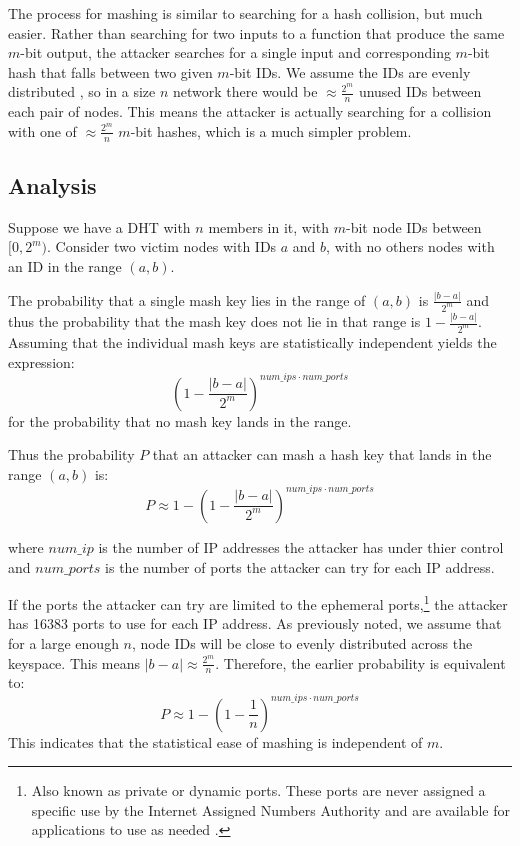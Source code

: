 \documentclass[11pt,conference]{IEEEtran}
\begin{document}
The process for mashing is similar to searching for a hash collision, but much easier.
Rather than searching for two inputs to a function that produce the same $m$-bit output, the attacker searches for a single input and corresponding $m$-bit hash that falls between two given $m$-bit IDs.
We assume the IDs are evenly distributed \cite{bellare2004hash}, so in a size $n$ network there would be $\approx \frac{2^{m}}{n}$ unused IDs between each pair of nodes.
This means the attacker is actually searching for a collision with one of $\approx \frac{2^{m}}{n}$ $m$-bit hashes, which is a much simpler problem.

\subsection{Analysis}


Suppose we have a DHT with $n$ members in it, with $m$-bit node IDs between $[0,2^{m})$. 
Consider two victim nodes with IDs $a$ and $b$, with no others nodes with an ID in the range $(a,b)$.

The probability that a single mash key lies in the range of $(a,b)$ is $\frac{|b-a|}{2^{m}}$ and thus the probability that the mash key does not lie in that range is $1-\frac{|b-a|}{2^{m}}$. 
Assuming that the individual mash keys are statistically independent yields the expression: $$(1-\frac{|b-a|}{2^{m}})^{num\_ips \cdot num\_ports} $$ for the probability that no mash key lands in the range.

Thus the probability $P$ that an attacker can mash a hash key that lands in the range $(a,b)$ is:
$$ P \approx 1 - (1 - \frac{|b-a|}{2^{m}})^{num\_ips \cdot num\_ports  } $$

where $num\_ip$ is the number of IP addresses the attacker has under thier control and $num\_ports$ is the number of ports the attacker can try for each IP address.


If the ports the attacker can try are limited to the ephemeral ports,\footnote{Also known as private or dynamic ports.  These ports are never assigned a specific use by the Internet Assigned Numbers Authority  and are available for applications to use as needed \cite{cotton2011internet}.} the attacker has 16383 ports to use for each IP address.
As previously noted, we assume that for a large enough $n$, node IDs will be close to evenly distributed across the keyspace.
This means $|b-a| \approx \frac{2^{m}}{n}$.
Therefore, the earlier probability is equivalent to:
$$ P \approx  1 - (1 -\frac{1}{n})^{num\_ips \cdot num\_ports}  $$
This indicates that the statistical ease of mashing is independent of $m$.
\end{document}
